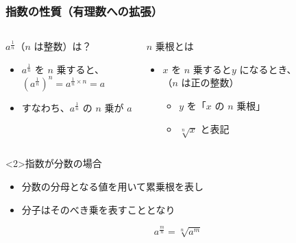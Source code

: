\documentclass[unicode,12pt,aspectratio=169]{beamer}
\begin{document}
\begin{frame}
	\frametitle{指数の性質（有理数への拡張）}
		\begin{columns}[c, onlytextwidth]
				\begin{block}{$a^{\frac{1}{n}}$（$n$ は整数）は？}
					\begin{itemize}
						\item $a^{\frac{1}{n}}$ を $n$ 乗すると、\\
								$(a^{\frac{1}{n}})^n=a^{\frac{1}{n} \times n} = a$
						\item すなわち、$a^{\frac{1}{n}}$ の $n$ 乗が $a$
					\end{itemize}
				\end{block}
				\begin{block}{$n$ 乗根とは}
					\begin{itemize}
						\item $x$ を $n$ 乗すると$y$ になるとき、\\
						（$n$ は正の整数）
						\begin{itemize}
							\item $y$ を「$x$ の $n$ 乗根」
							\item $\sqrt[n]{x}$ と表記
						\end{itemize}
					\end{itemize}
				\end{block}
		\end{columns}
	\begin{alertblock}{指数が分数の場合}
		\begin{itemize}
			\item 分数の分母となる値を用いて累乗根を表し
			\item 分子はそのべき乗を表すこととなり
		\end{itemize}
		\begin{equation*}
		a^{\frac{m}{n}}=\sqrt[n]{a^m}
		\end{equation*}
	\end{alertblock}
\end{frame}
\end{document}
